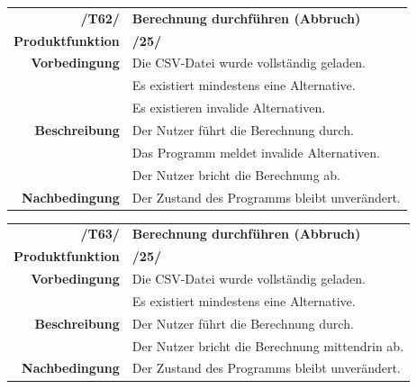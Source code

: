 \documentclass{article}
\begin{document}
\begin{table}[H]
\begin{tabularx}{\textwidth}{rX} \vspace{1mm}
\textbf{/T62/}         & \textbf{Berechnung durchführen (Abbruch)} \\ \vspace{1mm}
\textbf{Produktfunktion} & \textbf{/25/} \\
\textbf{Vorbedingung}  & Die CSV-Datei wurde vollständig geladen. \\ & Es existiert mindestens eine Alternative. \\ \vspace{1mm} & Es existieren invalide Alternativen. \\
\textbf{Beschreibung}  & Der Nutzer führt die Berechnung durch. \\ & Das Programm meldet invalide Alternativen. \\ \vspace{1mm} & Der Nutzer bricht die Berechnung ab. \\
\textbf{Nachbedingung} & Der Zustand des Programms bleibt unverändert.
\end{tabularx}
\end{table}

\begin{table}[H]
\begin{tabularx}{\textwidth}{rX} \vspace{1mm}
\textbf{/T63/}         & \textbf{Berechnung durchführen (Abbruch)} \\ \vspace{1mm}
\textbf{Produktfunktion} & \textbf{/25/} \\
\textbf{Vorbedingung}  & Die CSV-Datei wurde vollständig geladen. \\ \vspace{1mm} & Es existiert mindestens eine Alternative. \\
\textbf{Beschreibung}  & Der Nutzer führt die Berechnung durch. \\ \vspace{1mm} & Der Nutzer bricht die Berechnung mittendrin ab. \\
\textbf{Nachbedingung} & Der Zustand des Programms bleibt unverändert.
\end{tabularx}
\end{table}
\end{document}
